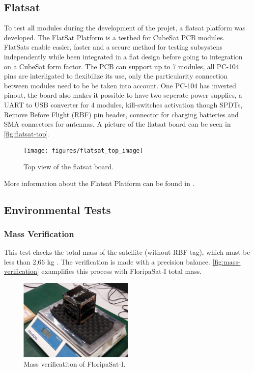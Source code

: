 \subsection{Flatsat}

To test all modules during the development of the projet, a flatsat platform was developed. The FlatSat Platform is a testbed for CubeSat PCB modules. FlatSats enable easier, faster and a secure method for testing subsystens independently while been integrated in a flat design before going to integration on a CubeSat form factor. The PCB can support up to 7 modules, all PC-104 pins are interligated to flexibilize its use, only the particularity connection between modules need to be be taken into account. One PC-104 has inverted pinout, the board also makes it possible to have two seperate power supplies, a UART to USB converter for 4 modules, kill-switches activation though SPDTs, Remove Before Flight (RBF) pin header, connector for charging batteries and SMA connectors for antennas. A picture of the flatsat board can be seen in \autoref{fig:flatsat-top}.

\begin{figure}[!ht]
    \begin{center}
        \texttt{[image: figures/flatsat\_top\_image]}
        \caption{Top view of the flatsat board.}
        \label{fig:flatsat-top}
    \end{center}
\end{figure}

More information about the Flatsat Platform can be found in \cite{flatsat}.

\subsection{Environmental Tests}

\cite{marcelino2021}

\subsubsection{Mass Verification}

This test checks the total mass of the satellite (without RBF tag), which must be less than 2,66 kg \cite{cds}. The verification is made with a precision balance. \autoref{fig:mass-verification} examplifies this process with FloripaSat-I total mass.

\begin{figure}[!ht]
    \begin{center}
        \includegraphics[width=0.5\textwidth]{figures/mass-test}
        \caption{Mass verificatiton of FloripaSat-I.}
        \label{fig:mass-verification}
    \end{center}
\end{figure}

